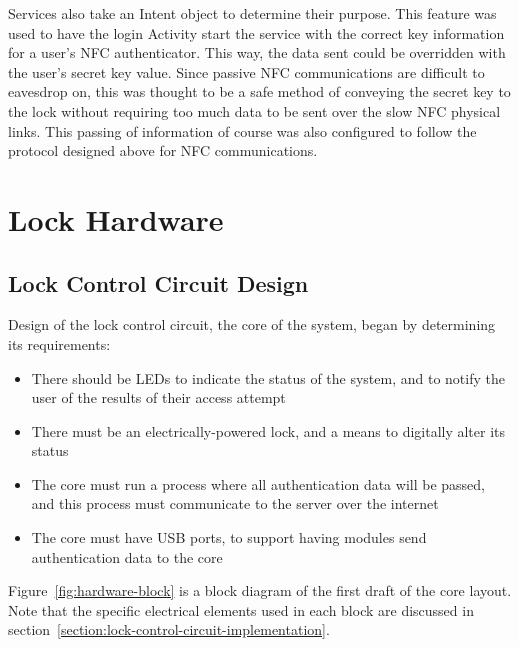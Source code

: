 \documentclass[12pt]{report}
\let\Oldsection\section
\renewcommand{\section}{\FloatBarrier\Oldsection}
\let\Oldsubsection\subsection
\renewcommand{\subsection}{\FloatBarrier\Oldsubsection}
\begin{document}
Services also take an Intent object to determine their purpose. This feature was used to have the login Activity start
the service with the correct key information for a user's NFC authenticator. This way, the data sent could be overridden
with the user's secret key value. Since passive NFC communications are difficult to eavesdrop on, this was thought to be
a safe method of conveying the secret key to the lock without requiring too much data to be sent over the slow NFC
physical links. This passing of information of course was also configured to follow the protocol designed above for NFC
communications.


\section{Lock Hardware} \label{lock-hardware}


\subsection{Lock Control Circuit Design} \label{lock-control-circuit-design}

Design of the lock control circuit, the core of the system, began by determining its requirements:
\begin{itemize}
    \item There should be LEDs to indicate the status of the system, and to notify the user of the results of their 
    access attempt
    \item There must be an electrically-powered lock, and a means to digitally alter its status
    \item The core must run a process where all authentication data will be passed, and this process must communicate 
    to the server over the internet
    \item The core must have USB ports, to support having modules send authentication data to the core
\end{itemize}

Figure~\ref{fig:hardware-block} is a block diagram of the first draft of the core layout. Note that the specific 
electrical elements used in each block are discussed in section~\ref{section:lock-control-circuit-implementation}.
\end{document}
